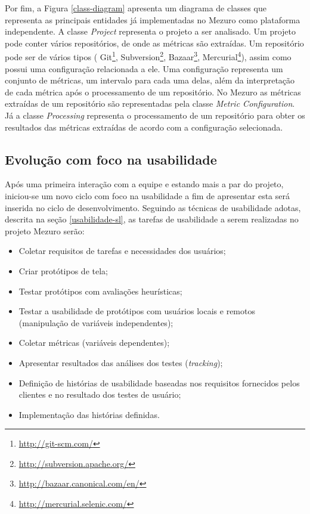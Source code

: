 Por fim, a Figura \ref{class-diagram} apresenta um diagrama de classes que representa as principais entidades já implementadas no Mezuro como plataforma independente. A classe \textit{Project} representa o projeto a ser analisado. Um projeto pode conter vários repositórios, de onde as métricas são extraídas.  Um repositório pode ser de vários tipos ( Git\footnote{\url{http://git-scm.com/}}, Subversion\footnote{\url{http://subversion.apache.org/}}, Bazaar\footnote{\url{http://bazaar.canonical.com/en/}},  Mercurial\footnote{\url{http://mercurial.selenic.com/}}), assim como possui uma configuração relacionada a ele.  Uma configuração representa um conjunto de métricas, um intervalo para cada uma delas, além da interpretação de cada métrica após o processamento de um repositório. No Mezuro as métricas extraídas de um repositório são representadas pela classe \textit{Metric Configuration}. Já a classe \textit{Processing} representa o processamento de um repositório para obter os resultados das métricas extraídas de acordo com a configuração selecionada.

%
\subsection{Evolução com foco na usabilidade}
\label{evolucao-usabilidade}

Após uma primeira interação com a equipe e estando mais a par do projeto, iniciou-se um novo ciclo com foco na usabilidade a fim de apresentar esta será inserida no ciclo de desenvolvimento. Seguindo as técnicas de usabilidade adotas, descrita na seção \ref{usabilidade-sl}, as tarefas de usabilidade a serem realizadas no projeto Mezuro serão:
\begin{itemize}
\item Coletar requisitos de tarefas e necessidades dos usuários;
\item Criar protótipos de tela;
\item Testar protótipos com avaliações heurísticas;
\item Testar a usabilidade de protótipos com usuários locais e remotos (manipulação de variáveis independentes);
\item Coletar métricas (variáveis dependentes);
\item Apresentar resultados das análises dos testes (\textit{tracking});
\item Definição de histórias de usabilidade baseadas nos requisitos fornecidos pelos clientes e no resultado dos testes de usuário;
\item Implementação das histórias definidas.
\end{itemize}


